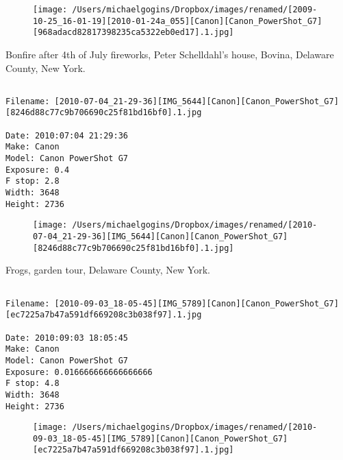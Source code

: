 \begin{figure}
\texttt{[image: /Users/michaelgogins/Dropbox/images/renamed/[2009-10-25\_16-01-19][2010-01-24a\_055][Canon][Canon\_PowerShot\_G7][968adacd82817398235ca5322eb0ed17].1.jpg]}
\end{figure}
    
\clearpage
\onecolumn
\noindent Bonfire after 4th of July fireworks, Peter Schelldahl's house, Bovina, Delaware County, New York.
\noindent
\begin{lstlisting}

Filename: [2010-07-04_21-29-36][IMG_5644][Canon][Canon_PowerShot_G7][8246d88c77c9b706690c25f81bd16bf0].1.jpg

Date: 2010:07:04 21:29:36
Make: Canon
Model: Canon PowerShot G7
Exposure: 0.4
F stop: 2.8
Width: 3648
Height: 2736
\end{lstlisting}
\clearpage

\begin{figure}
\texttt{[image: /Users/michaelgogins/Dropbox/images/renamed/[2010-07-04\_21-29-36][IMG\_5644][Canon][Canon\_PowerShot\_G7][8246d88c77c9b706690c25f81bd16bf0].1.jpg]}
\end{figure}
    
\clearpage
\onecolumn
\noindent Frogs, garden tour, Delaware County, New York.
\noindent
\begin{lstlisting}

Filename: [2010-09-03_18-05-45][IMG_5789][Canon][Canon_PowerShot_G7][ec7225a7b47a591df669208c3b038f97].1.jpg

Date: 2010:09:03 18:05:45
Make: Canon
Model: Canon PowerShot G7
Exposure: 0.016666666666666666
F stop: 4.8
Width: 3648
Height: 2736
\end{lstlisting}
\clearpage

\begin{figure}
\texttt{[image: /Users/michaelgogins/Dropbox/images/renamed/[2010-09-03\_18-05-45][IMG\_5789][Canon][Canon\_PowerShot\_G7][ec7225a7b47a591df669208c3b038f97].1.jpg]}
\end{figure}
    
